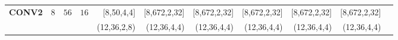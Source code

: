 \begin{table}[]
\begin{threeparttable}
\begin{tabular}{lrrrrrrrrrr }
\multirow{-2}{*}{\textbf{CONV2}} &\multirow{-2}{*}{8}&\multirow{-2}{*}{$56$} & \multirow{-2}{*}{$16$}&[\hspace{0.5em}8,\hspace{1em}50,\hspace{0.5em}4,\hspace{0.5em}\hspace{0.5em}4] &[\hspace{0.5em}8,\hspace{0.5em}672,\hspace{0.5em}2,\hspace{0.5em}32] &[\hspace{0.5em}8,\hspace{0.5em}672,\hspace{0.5em}2,\hspace{0.5em}32] &[\hspace{0.5em}8,\hspace{0.5em}672,\hspace{0.5em}2,\hspace{0.5em}32] &[\hspace{0.5em}8,\hspace{0.5em}672,\hspace{0.5em}2,\hspace{0.5em}32] &[\hspace{0.5em}8,\hspace{0.5em}672,\hspace{0.5em}2,\hspace{0.5em}32] \\
\rowcolor{Gray}& & & &(12,\hspace{1em}36,\hspace{0.5em}2,\hspace{0.5em}\hspace{0.5em}8) &(12,\hspace{1em}36,\hspace{0.5em}4,\hspace{0.5em}\hspace{0.5em}4) &(12,\hspace{1em}36,\hspace{0.5em}4,\hspace{0.5em}\hspace{0.5em}4) &(12,\hspace{1em}36,\hspace{0.5em}4,\hspace{0.5em}\hspace{0.5em}4) &(12,\hspace{1em}36,\hspace{0.5em}4,\hspace{0.5em}\hspace{0.5em}4) &(12,\hspace{1em}36,\hspace{0.5em}4,\hspace{0.5em}\hspace{0.5em}4) \\

\end{tabular}
\end{threeparttable}
\end{table}
